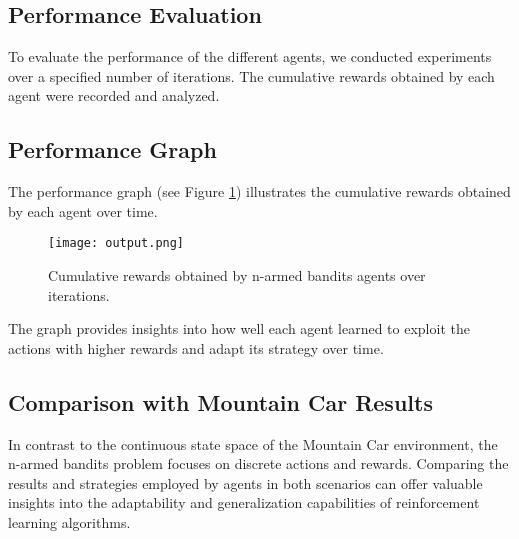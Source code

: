 \documentclass{article}
\begin{document}
\subsection{Performance Evaluation}
To evaluate the performance of the different agents, we conducted experiments over a specified number of iterations. The cumulative rewards obtained by each agent were recorded and analyzed.

\subsection{Performance Graph}
The performance graph (see Figure \ref{fig:bandit_performance}) illustrates the cumulative rewards obtained by each agent over time.

\begin{figure}[ht]
    \centering
    \texttt{[image: output.png]}
    \caption{Cumulative rewards obtained by n-armed bandits agents over iterations.}
    \label{fig:bandit_performance}
\end{figure}

The graph provides insights into how well each agent learned to exploit the actions with higher rewards and adapt its strategy over time.

\subsection{Comparison with Mountain Car Results}
In contrast to the continuous state space of the Mountain Car environment, the n-armed bandits problem focuses on discrete actions and rewards. Comparing the results and strategies employed by agents in both scenarios can offer valuable insights into the adaptability and generalization capabilities of reinforcement learning algorithms.
\end{document}
